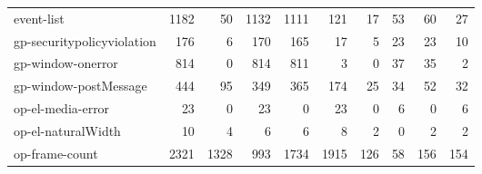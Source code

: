 \begin{tabular}{lrrrrrrrrr}
                event-list &                             1182 &                                 50 &                                   1132 &                         1111 &                         121 &                                  17 &                                     53 &                            60 &                           27 \\
gp-securitypolicyviolation &                              176 &                                  6 &                                    170 &                          165 &                          17 &                                   5 &                                     23 &                            23 &                           10 \\
         gp-window-onerror &                              814 &                                  0 &                                    814 &                          811 &                           3 &                                   0 &                                     37 &                            35 &                            2 \\
     gp-window-postMessage &                              444 &                                 95 &                                    349 &                          365 &                         174 &                                  25 &                                     34 &                            52 &                           32 \\
         op-el-media-error &                               23 &                                  0 &                                     23 &                            0 &                          23 &                                   0 &                                      6 &                             0 &                            6 \\
        op-el-naturalWidth &                               10 &                                  4 &                                      6 &                            6 &                           8 &                                   2 &                                      0 &                             2 &                            2 \\
            op-frame-count &                             2321 &                               1328 &                                    993 &                         1734 &                        1915 &                                 126 &                                     58 &                           156 &                          154 \\

\end{tabular}
